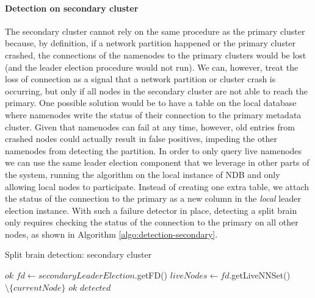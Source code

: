 \paragraph{Detection on secondary cluster}

The secondary cluster cannot rely on the same procedure as the primary cluster because, by definition, if a network partition happened or the primary cluster crashed, the connections of the namenodes to the primary clusters would be lost (and the leader election procedure would not run).
We can, however, treat the loss of connection as a signal that a network partition or cluster crash is occurring, but only if all nodes in the secondary cluster are not able to reach the primary.
One possible solution would be to have a table on the local database where namenodes write the status of their connection to the primary metadata cluster.
Given that namenodes can fail at any time, however, old entries from crashed nodes could actually result in false positives, impeding the other namenodes from detecting the partition.
In order to only query live namenodes we can use the same leader election component that we leverage in other parts of the system, running the algorithm on the local instance of NDB and only allowing local nodes to participate.
Instead of creating one extra table, we attach the status of the connection to the primary as a new column in the \emph{local} leader election instance.
With such a failure detector in place, detecting a split brain only requires checking the status of the connection to the primary on all other nodes, as shown in Algorithm \ref{algo:detection-secondary}.

\begin{algorithm}[!ht]
	\begin{algorithmic}[1]
  		\caption{Split brain detection: secondary cluster}
  		\label{algo:detection-secondary}
  		    \State \Return $ok$
  		\EndIf
  		\State $fd \leftarrow secondaryLeaderElection$.getFD()
		\State $liveNodes \leftarrow fd$.getLiveNNSet() $\setminus \{currentNode\}$
		        \State \Return $ok$
		    \EndIf
		\EndFor
		\State \Return $detected$
  	\end{algorithmic}
\end{algorithm}

